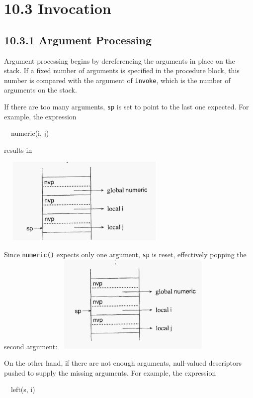 \section[10.3 Invocation]{10.3 Invocation}
\subsection[10.3.1 Argument Processing]{10.3.1 Argument Processing}

Argument processing begins by dereferencing the arguments in place on
the stack. If a fixed number of arguments is specified in the
procedure block, this number is compared with the argument of
\texttt{invoke}, which is the number of arguments on the stack.


If there are too many arguments, \texttt{sp} is set to point to the
last one expected. For example, the expression

{\ttfamily\mdseries
\ \ numeric(i, j)}

\noindent results in

\bigskip

\ \  \includegraphics[width=3.0984in,height=1.6457in]{ib-img/ib-img080.jpg} 


Since \texttt{numeric()} expects only one argument, \texttt{sp} is reset, effectively popping the second argument:\ \ 
\includegraphics[width=2.8846in,height=1.8728in]{ib-img/ib-img081.jpg} 

On the other hand, if there are not enough arguments, null-valued
descriptors pushed to supply the missing arguments.  For example, the
expression

{\ttfamily\mdseries
\ \ left(s, i)}

